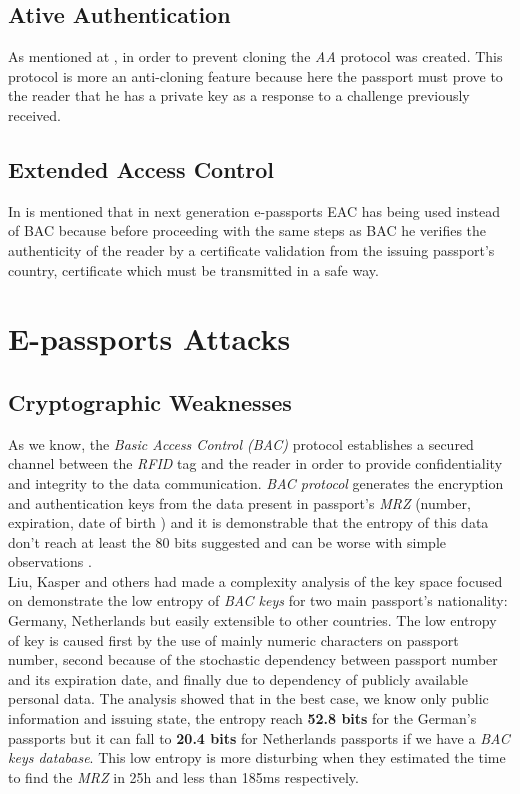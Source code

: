 \documentclass{acm_proc_article-sp}
\begin{document}
\subsection{Ative Authentication}
As mentioned at \cite{JUAR2005}, in order to prevent cloning the \textit{AA} protocol was created. 
This protocol is more an anti-cloning feature because here the passport must prove 
to the reader that he has a private key as a response to a challenge previously received.

\subsection{Extended Access Control}
In \cite{NM12} is mentioned that in next generation e-passports EAC has being used 
instead of BAC because before proceeding with the same steps as BAC he verifies the 
authenticity of the reader by a certificate validation from the issuing passport’s country, 
certificate which must be transmitted in a safe way.


\section{E-passports Attacks}
\label{sec:sec3}

\subsection{Cryptographic Weaknesses}
\label{subsec:crypt}
As we know, the \textit{Basic Access Control (BAC)} protocol establishes a secured channel between 
the \textit{RFID} tag and the reader in order to provide confidentiality and integrity to the 
data communication. \textit{BAC protocol} generates the encryption and authentication keys from the data 
present in passport's \textit {MRZ} (number, expiration, date of birth ) and it is demonstrable 
that the entropy of this data don’t reach at least the 80 bits suggested and can be worse 
with simple observations \cite{JUAR2005} \cite{02COPA}.\\
Liu, Kasper and others \cite{02COPA} had made a complexity analysis of the key space focused on 
demonstrate the low entropy of \textit{BAC keys} for two main passport’s nationality: Germany, 
Netherlands but easily extensible to other countries. The low entropy of key is caused 
first by the use of mainly numeric characters on passport number, 
second because of the stochastic dependency between passport number and its expiration 
date, and finally due to dependency of publicly available personal data. The analysis 
showed that in the best case, we know only public information and issuing state, the 
entropy reach \textbf {52.8 bits} for the German’s passports but it can fall to \textbf {20.4 bits} for 
Netherlands passports if we have a \textit{BAC keys database}. This low entropy is more disturbing 
when they estimated the time to find the \textit{MRZ} in 25h and less than 185ms 
respectively.
\end{document}
